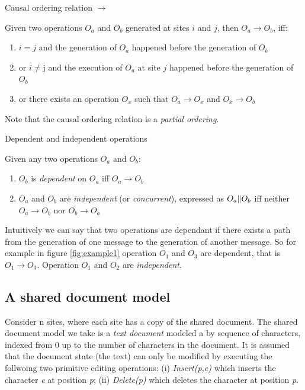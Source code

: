 \documentclass[11pt,a4paper]{article}
\begin{document}
\begin{defn}
Causal ordering relation $\rightarrow$
\end{defn}

Given two operations $O_{a}$ and $O_{b}$ generated at sites $i$ and $j$, then $O_{a}\rightarrow O_{b}$, iff:
\begin{enumerate}
 \item $i=j$ and the generation of $O_{a}$ happened before the generation of 
       $O_{b}$
 \item or $i \neq $j and the execution of $O_{a}$ at site $j$ happened before 
       the generation of $O_{b}$
 \item or there exists an operation $O_{x}$ such that $O_{a}\rightarrow O_{x}$
       and $O_{x}\rightarrow O_{b}$
\end{enumerate}

Note that the causal ordering relation is a \emph{partial ordering}.

\begin{defn}
Dependent and independent operations
\end{defn}

Given any two operations $O_{a}$ and $O_{b}$:
\begin{enumerate}
 \item $O_{b}$ is \emph{dependent} on $O_{a}$ iff $O_{a} \rightarrow O_{b}$
 \item $O_{a}$ and $O_{b}$ are \emph{independent} (or \emph{concurrent}), 
       expressed as $O_{a} \Arrowvert O_{b}$ iff neither 
       $O_{a}\rightarrow O_{b}$ nor $O_{b}\rightarrow O_{a}$
\end{enumerate}

Intuitively we can say that two operations are dependant if there exists a path from the generation of one message to the generation of another message. So for example in figure \ref{fig:example1} operation $O_{1}$ and $O_{3}$ are dependent, that is $O_{1}\rightarrow O_{3}$. Operation $O_{1}$ and $O_{2}$ are \emph{independent}. 

\subsection{A shared document model}
Consider n sites, where each site has a copy of the shared document. The shared document model we take is a \emph{text document} modeled a by sequence of characters, indexed from 0 up to the number of characters in the document. It is assumed that the document state (the text) can only be modified by executing the follwoing two primitive editing operations: (i) \emph{Insert(p,c)} which inserts the character \emph{c} at position \emph{p}; (ii) \emph{Delete(p)} which deletes the character at position \emph{p}.
\end{document}
